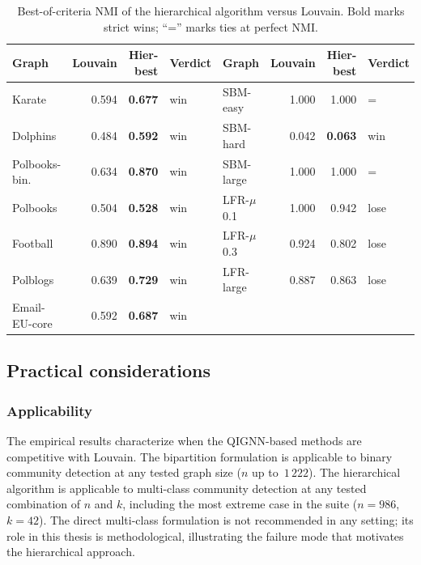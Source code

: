 \begin{table}[H]
    \caption{Best-of-criteria NMI of the hierarchical algorithm
    versus Louvain. Bold marks strict wins; ``='' marks ties at
    perfect NMI.}
    \label{tab:hier_best_nmi}
    \centering
    \small
    \begin{tabular}{lrrl|lrrl}
        \toprule
        Graph & Louvain & Hier-best & Verdict & Graph & Louvain & Hier-best & Verdict \\
        \midrule
        Karate          & 0.594 & \textbf{0.677} & win   & SBM-easy     & 1.000 & 1.000 & = \\
        Dolphins        & 0.484 & \textbf{0.592} & win   & SBM-hard     & 0.042 & \textbf{0.063} & win \\
        Polbooks-bin.   & 0.634 & \textbf{0.870} & win   & SBM-large    & 1.000 & 1.000 & = \\
        Polbooks        & 0.504 & \textbf{0.528} & win   & LFR-$\mu$0.1 & 1.000 & 0.942 & lose \\
        Football        & 0.890 & \textbf{0.894} & win   & LFR-$\mu$0.3 & 0.924 & 0.802 & lose \\
        Polblogs        & 0.639 & \textbf{0.729} & win   & LFR-large    & 0.887 & 0.863 & lose \\
        Email-EU-core   & 0.592 & \textbf{0.687} & win   &              &       &       &      \\
        \bottomrule
    \end{tabular}
\end{table}

\subsection{Practical considerations}
\label{sec:exp_practical}

\subsubsection{Applicability}
\label{sec:exp_applicability}

The empirical results characterize when the QIGNN-based methods
are competitive with Louvain. The bipartition formulation is
applicable to binary community detection at any tested graph size
($n$ up to~$1\,222$). The hierarchical algorithm is applicable
to multi-class community detection at any tested combination of
$n$ and $k$, including the most extreme case in the suite
($n = 986$, $k = 42$). The direct multi-class formulation is
not recommended in any setting; its role in this thesis is
methodological, illustrating the failure mode that motivates
the hierarchical approach.

